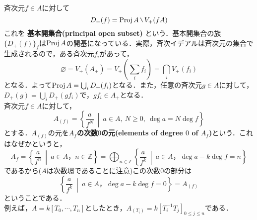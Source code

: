 斉次元$f\in A$に対して
\begin{equation*}
  D_{+}(f) = \proj{A}\mysetminus V_{+}(fA)
\end{equation*}
これを
\textbf{基本開集合(principal open subset)}
という．基本開集合の族$\{D_{+}(f)\}_{f}$は$\mathrm{Proj}\, A$の開基になっている．実際，斉次イデアルは斉次元の集合で生成されるので，ある斉次元$f_{i}$があって，
\begin{equation*}
  \varnothing = V_{+}(A_{+}) = V_{+}(\sum_{i}f_{i}) = \bigcap_{i}V_{+}(f_{i})
\end{equation*}
となる．よって$\mathrm{Proj}\, A = \bigcup_{i}D_{+}(f_{i})$となる．また，任意の斉次元$g\in A$に対して，$D_{+}(g) = \bigcup_{i}D_{+}(gf_{i})$で，$gf_{i} \in A_{+}$となる．\\
斉次元$f\in A$に対して，
\begin{equation*}
  A_{(f)} = \left\{ \frac{a}{f^{N}}\ \middle\vert \ a\in A,\ N\geq 0,\ \deg{a} = N\deg{f} \right\}
\end{equation*}
とする．$A_{(f)}$の元を\textbf{$A_{f}$の次数$0$の元(elements of degree $0$ of $A_{f}$)}という．これはなぜかというと，
\begin{equation*}
  A_{f} = \left\{\frac{a}{f^{n}}\ \middle\vert \ a\in A，n\in \mathbb{Z}\right\}
        = \bigoplus_{n \in \mathbb{Z}}\left\{ \frac{a}{f^{k}}\ \middle\vert \ a\in A，\deg{a} - k\deg{f} = n \right\}
\end{equation*}
であるから($A$は次数環であることに注意)この次数$0$の部分は
\begin{equation*}
  \left\{ \frac{a}{f^{k}} \ \middle\vert \ a\in A，\deg{a} - k\deg{f} = 0\right\} = A_{(f)}
\end{equation*}
ということである．\\
例えば，$A = k[T_{0},\cdots,T_{n}]$としたとき，$A_{(T_{i})} = k[T_{i}^{-1}T_{j}]_{0\leq j\leq n}$である．
